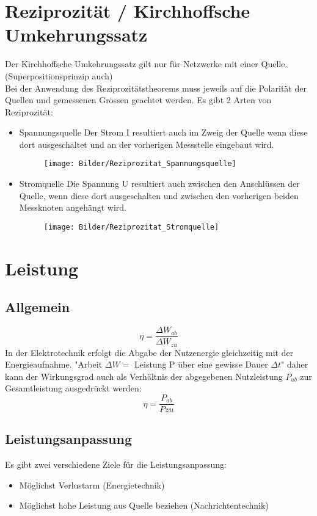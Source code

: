 \documentclass{article}
\begin{document}
\section{Reziprozität / Kirchhoffsche Umkehrungssatz}
Der Kirchhoffsche Umkehrungssatz gilt nur für Netzwerke mit einer Quelle. (Superpositionsprinzip auch) \\
Bei der Anwendung des Reziprozitätstheorems muss jeweils auf die Polarität der Quellen und gemessenen Grössen geachtet werden.
Es gibt 2 Arten von Reziprozität: \\
\begin{itemize}
	\item Spannungsquelle
	\subitem Der Strom I resultiert auch im Zweig der Quelle wenn diese dort ausgeschaltet und an der vorherigen Messstelle eingebaut wird.
	\begin{figure}[htbp]
		\centering
		\texttt{[image: Bilder/Reziprozitat\_Spannungsquelle]}
	\end{figure}
	\item Stromquelle
	\subitem Die Spannung U resultiert auch zwischen den Anschlüssen der Quelle, wenn diese dort ausgeschalten und zwischen den vorherigen beiden Messknoten angehängt wird.
	\begin{figure}[htbp]
		\centering
		\texttt{[image: Bilder/Reziprozitat\_Stromquelle]}
	\end{figure}
\end{itemize}
\section{Leistung}
\subsection{Allgemein}
\begin{equation}
	\eta = \frac{\Delta W_{ab}}{\Delta W_{zu}}
\end{equation}
In der Elektrotechnik erfolgt die Abgabe der Nutzenergie gleichzeitig mit der Energieaufnahme. "Arbeit $\Delta W =$ Leistung P über eine gewisse Dauer $\Delta t$" daher kann der Wirkungsgrad auch als Verhältnis der abgegebenen Nutzleistung $P_{ab}$ zur Gesamtleistung ausgedrückt werden:
\begin{equation}
\eta = \frac{P_{ab}}{P{zu}}
\end{equation}
\subsection{Leistungsanpassung}
Es gibt zwei verschiedene Ziele für die Leistungsanpassung:
\begin{itemize}
	\item Möglichst Verlustarm (Energietechnik)
	\item Möglichst hohe Leistung aus Quelle beziehen (Nachrichtentechnik)
\end{itemize}
\newpage
\end{document}
